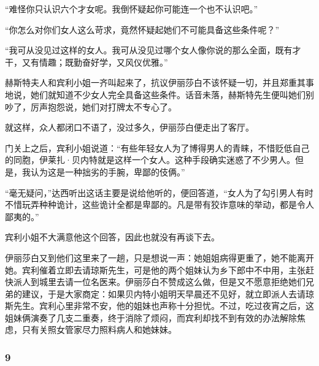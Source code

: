 \par “难怪你只认识六个才女呢。我倒怀疑起你可能连一个也不认识吧。”
\par “你怎么对你们女人这么苛求，竟然怀疑起她们不可能具备这些条件呢？”
\par “我可从没见过这样的女人。我可从没见过哪个女人像你说的那么全面，既有才干，又有情趣；既勤奋好学，又风仪优雅。”
\par 赫斯特夫人和宾利小姐一齐叫起来了，抗议伊丽莎白不该怀疑一切，并且郑重其事地说，她们就知道不少女人完全具备这些条件。话音未落，赫斯特先生便叫她们别吵了，厉声抱怨说，她们对打牌太不专心了。
\par 就这样，众人都闭口不语了，没过多久，伊丽莎白便走出了客厅。
\par 门关上之后，宾利小姐说道：“有些年轻女人为了博得男人的青睐，不惜贬低自己的同胞，伊莱扎·贝内特就是这样一个女人。这种手段确实迷惑了不少男人。但是，我认为这是一种拙劣的手腕，卑鄙的伎俩。”
\par “毫无疑问，”达西听出这话主要是说给他听的，便回答道，“女人为了勾引男人有时不惜玩弄种种诡计，这些诡计全都是卑鄙的。凡是带有狡诈意味的举动，都是令人鄙夷的。”
\par 宾利小姐不大满意他这个回答，因此也就没有再谈下去。
\par 伊丽莎白又到他们这里来了一趟，只是想说一声：她姐姐病得更重了，她不能离开她。宾利催着立即去请琼斯先生，可是他的两个姐妹认为乡下郎中不中用，主张赶快派人到城里去请一位名医来。伊丽莎白不赞成这么做，但是又不愿意拒绝她们兄弟的建议，于是大家商定：如果贝内特小姐明天早晨还不见好，就立即派人去请琼斯先生。宾利心里非常不安，他的姐妹也声称十分担忧。不过，吃过夜宵之后，这姐妹俩演奏了几支二重奏，终于消除了烦闷，而宾利却找不到有效的办法解除焦虑，只有关照女管家尽力照料病人和她妹妹。



\subsubsection*{9}


